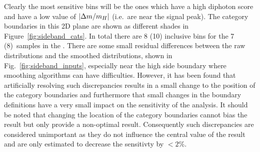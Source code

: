 Clearly the most sensitive bins will be the ones which have a high diphoton \BDT score and have a low value of $|\Delta m/m_{H}|$ (i.e.\ are near the signal peak). The category boundaries in this 2D plane are shown as different shades in Figure~\ref{fig:sideband_cats}. In total there are 8 (10) inclusive bins for the 7 (8)~\TeV samples in the \SMVA. There are some small residual differences between the raw \MC distributions and the smoothed distributions, shown in Fig.~\ref{fig:sideband_inputs}, especially near the high side boundary where smoothing algorithms can have difficulties. However, it has been found that artificially resolving such discrepancies results in a small change to the position of the category boundaries and furthermore that small changes in the boundary definitions have a very small impact on the sensitivity of the analysis. It should be noted that changing the location of the category boundaries cannot bias the result but only provide a non-optimal result. Consequently such discrepancies are considered unimportant as they do not influence the central value of the result and are only estimated to decrease the sensitivty by $<2\%$.

